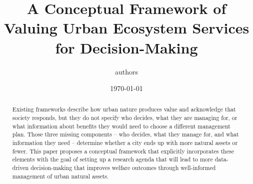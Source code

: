 \documentclass[12pt]{article}
\title{A Conceptual Framework of Valuing Urban Ecosystem Services for Decision-Making}
\author{authors}
\date{\today}
\begin{document}
\maketitle

\begin{abstract}
\footnotesize
Existing frameworks describe how urban nature produces value and acknowledge that society responds, but they do not specify who decides, what they are managing for, or what information about benefits they would need to choose a different management plan. Those three missing components -- who decides, what they manage for, and what information they need -- determine whether a city ends up with more natural assets or fewer. This paper proposes a conceptual framework that explicitly incorporates these elements with the goal of setting up a research agenda that will lead to more data-driven decision-making that improves welfare outcomes through well-informed management of urban natural assets.
\end{abstract}



\end{document}
